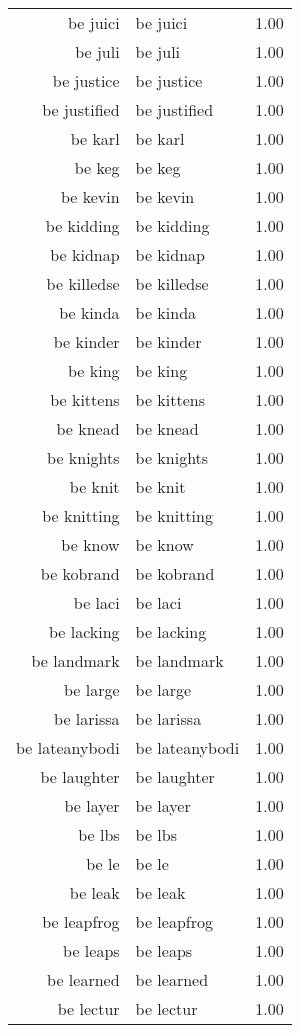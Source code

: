 \begin{table}[ht]
\begin{tabular}{rlr}
  be juici & be juici & 1.00 \\ 
  be juli & be juli & 1.00 \\ 
  be justice & be justice & 1.00 \\ 
  be justified & be justified & 1.00 \\ 
  be karl & be karl & 1.00 \\ 
  be keg & be keg & 1.00 \\ 
  be kevin & be kevin & 1.00 \\ 
  be kidding & be kidding & 1.00 \\ 
  be kidnap & be kidnap & 1.00 \\ 
  be killedse & be killedse & 1.00 \\ 
  be kinda & be kinda & 1.00 \\ 
  be kinder & be kinder & 1.00 \\ 
  be king & be king & 1.00 \\ 
  be kittens & be kittens & 1.00 \\ 
  be knead & be knead & 1.00 \\ 
  be knights & be knights & 1.00 \\ 
  be knit & be knit & 1.00 \\ 
  be knitting & be knitting & 1.00 \\ 
  be know & be know & 1.00 \\ 
  be kobrand & be kobrand & 1.00 \\ 
  be laci & be laci & 1.00 \\ 
  be lacking & be lacking & 1.00 \\ 
  be landmark & be landmark & 1.00 \\ 
  be large & be large & 1.00 \\ 
  be larissa & be larissa & 1.00 \\ 
  be lateanybodi & be lateanybodi & 1.00 \\ 
  be laughter & be laughter & 1.00 \\ 
  be layer & be layer & 1.00 \\ 
  be lbs & be lbs & 1.00 \\ 
  be le & be le & 1.00 \\ 
  be leak & be leak & 1.00 \\ 
  be leapfrog & be leapfrog & 1.00 \\ 
  be leaps & be leaps & 1.00 \\ 
  be learned & be learned & 1.00 \\ 
  be lectur & be lectur & 1.00 \\ 

\end{tabular}
\end{table}
